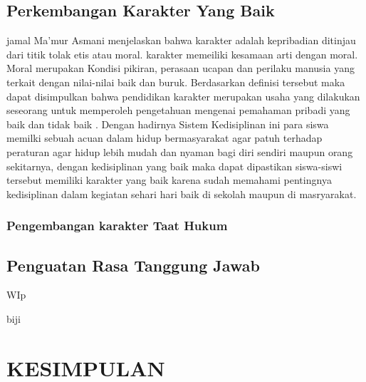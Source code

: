 \documentclass[f4paper,12pt, left=2.5cm,right=2cm,bottom=2cm, bahasa]{article}
\begin{document}
\subsection{Perkembangan Karakter Yang Baik}
jamal Ma'mur Asmani \cite{samrin2016pendidikan} menjelaskan bahwa karakter adalah kepribadian ditinjau dari titik tolak etis atau moral. karakter memeiliki kesamaan arti dengan moral. Moral merupakan Kondisi pikiran, perasaan ucapan dan perilaku manusia yang terkait dengan nilai-nilai baik dan buruk. Berdasarkan definisi tersebut maka dapat disimpulkan bahwa pendidikan karakter merupakan usaha yang dilakukan seseorang untuk memperoleh pengetahuan mengenai pemahaman pribadi yang baik dan tidak baik \cite{febriyanto2020pendidikan}.
Dengan hadirnya Sistem Kedisiplinan ini para siswa memilki sebuah acuan dalam hidup bermasyarakat agar patuh terhadap peraturan agar hidup lebih mudah dan nyaman bagi diri sendiri maupun orang sekitarnya, dengan kedisiplinan yang baik maka dapat dipastikan siswa-siswi tersebut memiliki karakter yang baik karena sudah memahami pentingnya kedisiplinan dalam kegiatan sehari hari baik di sekolah maupun di masryarakat.
\subsubsection{Pengembangan karakter Taat Hukum}
\subsection{Penguatan Rasa Tanggung Jawab}
WIp

biji


\section*{KESIMPULAN}
\end{document}
